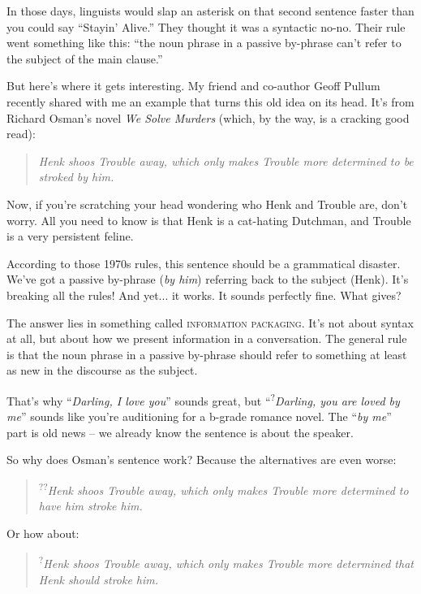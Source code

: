 In those days, linguists would slap an asterisk on that second sentence faster than you could say ``Stayin' Alive.'' They thought it was a syntactic no-no. Their rule went something like this: ``the noun phrase in a passive by-phrase can't refer to the subject of the main clause.''

But here's where it gets interesting. My friend and co-author Geoff Pullum recently shared with me an example that turns this old idea on its head. It's from Richard Osman's novel \textit{We Solve Murders} (which, by the way, is a cracking good read):

\begin{quote}
\textit{Henk shoos Trouble away, which only makes Trouble more determined to be stroked by him.}
\end{quote}

Now, if you're scratching your head wondering who Henk and Trouble are, don't worry. All you need to know is that Henk is a cat-hating Dutchman, and Trouble is a very persistent feline.

According to those 1970s rules, this sentence should be a grammatical disaster. We've got a passive by-phrase (\textit{by him}) referring back to the subject (Henk). It's breaking all the rules! And yet... it works. It sounds perfectly fine. What gives?

The answer lies in something called \textsc{information packaging}. It's not about syntax at all, but about how we present information in a conversation. The general rule is that the noun phrase in a passive by-phrase should refer to something at least as new in the discourse as the subject.

That's why ``\textit{Darling, I love you}'' sounds great, but ``\textsuperscript{?}\textit{Darling, you are loved by me}'' sounds like you're auditioning for a b-grade romance novel. The ``\textit{by me}'' part is old news -- we already know the sentence is about the speaker.

So why does Osman's sentence work? Because the alternatives are even worse:

\begin{quote}
\textsuperscript{??}\textit{Henk shoos Trouble away, which only makes Trouble more determined to have him stroke him.}
\end{quote}

Or how about:

\begin{quote}
\textsuperscript{?}\textit{Henk shoos Trouble away, which only makes Trouble more determined that Henk should stroke him.}
\end{quote}

